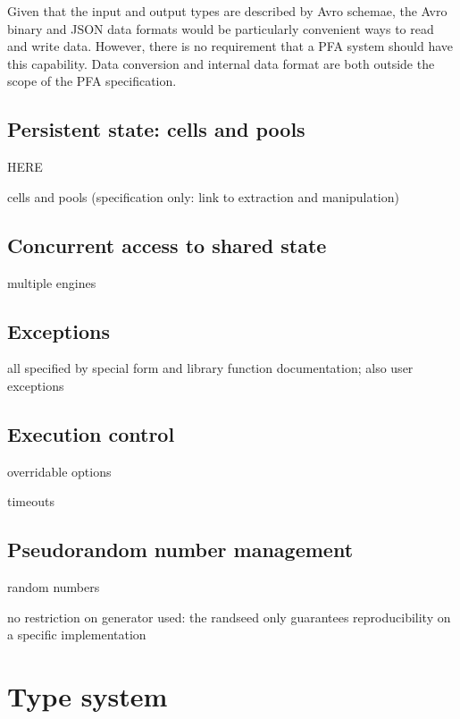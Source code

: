\documentclass{article}
\theoremstyle{definition}
\begin{document}
Given that the input and output types are described by Avro schemae, the Avro binary and JSON data formats would be particularly convenient ways to read and write data.  However, there is no requirement that a PFA system should have this capability.  Data conversion and internal data format are both outside the scope of the PFA specification.

\hypertarget{hsec:state}{}
\subsection{Persistent state: cells and pools}
\label{sec:state}

HERE



cells and pools (specification only: link to extraction and manipulation)

\hypertarget{hsec:concurrent}{}
\subsection{Concurrent access to shared state}
\label{sec:concurrent}

multiple engines

\hypertarget{hsec:exceptions}{}
\subsection{Exceptions}
\label{sec:exceptions}

all specified by special form and library function documentation; also user exceptions

\hypertarget{hsec:control}{}
\subsection{Execution control}
\label{sec:control}

overridable options

timeouts

\hypertarget{hsec:random}{}
\subsection{Pseudorandom number management}
\label{sec:random}

random numbers

no restriction on generator used: the randseed only guarantees reproducibility on a specific implementation

\pagebreak

\section{Type system}
\end{document}
